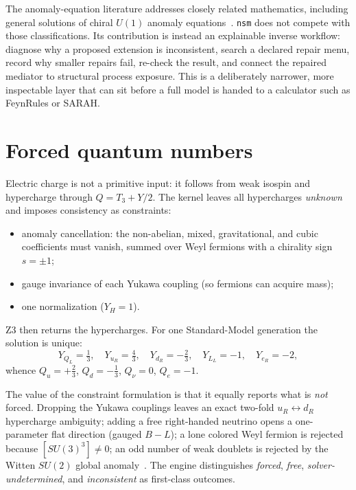 \documentclass[11pt]{article}
\newcommand{\nsm}{\texttt{nsm}}
\newcommand{\SUthree}{SU(3)}
\newcommand{\SUtwo}{SU(2)}
\begin{document}
The anomaly-equation literature addresses closely related mathematics, including
general solutions of chiral $U(1)$ anomaly equations~\cite{u1solution}. \nsm{}
does not compete with those classifications. Its contribution is instead an
explainable inverse workflow: diagnose why a proposed extension is inconsistent,
search a declared repair menu, record why smaller repairs fail, re-check the
result, and connect the repaired mediator to structural process exposure. This
is a deliberately narrower, more inspectable layer that can sit before a full
model is handed to a calculator such as FeynRules or SARAH.

\section{Forced quantum numbers}
\label{sec:kernel}

Electric charge is not a primitive input: it follows from weak isospin and
hypercharge through $Q = T_3 + Y/2$. The kernel leaves all hypercharges
\emph{unknown} and imposes consistency as constraints:
\begin{itemize}
\item anomaly cancellation: the non-abelian, mixed, gravitational, and cubic
coefficients must vanish, summed over Weyl fermions with a chirality sign
$s=\pm 1$;
\item gauge invariance of each Yukawa coupling (so fermions can acquire mass);
\item one normalization ($Y_H = 1$).
\end{itemize}
Z3 then returns the hypercharges. For one Standard-Model generation the solution
is unique:
\begin{equation}
Y_{Q_L}=\tfrac13,\quad Y_{u_R}=\tfrac43,\quad Y_{d_R}=-\tfrac23,\quad
Y_{L_L}=-1,\quad Y_{e_R}=-2,
\end{equation}
whence $Q_u=+\tfrac23$, $Q_d=-\tfrac13$, $Q_\nu=0$, $Q_e=-1$.

The value of the constraint formulation is that it equally reports what is
\emph{not} forced. Dropping the Yukawa couplings leaves an exact two-fold
$u_R\!\leftrightarrow\!d_R$ hypercharge ambiguity; adding a free right-handed
neutrino opens a one-parameter flat direction (gauged $B\!-\!L$); a lone colored
Weyl fermion is rejected because $[\SUthree^3]\neq 0$; an odd number of weak
doublets is rejected by the Witten $\SUtwo$ global anomaly~\cite{witten}. The
engine distinguishes \emph{forced}, \emph{free}, \emph{solver-undetermined}, and
\emph{inconsistent} as first-class outcomes.
\end{document}
